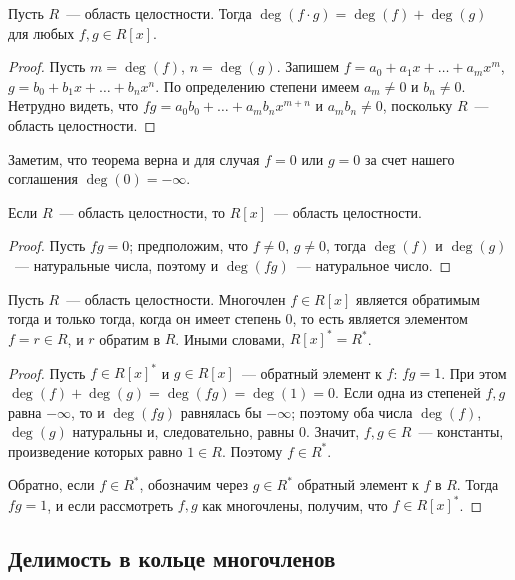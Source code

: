\begin{theorem}
Пусть $R$~--- область целостности. Тогда
$\deg(f\cdot g)=\deg(f)+\deg(g)$ для любых $f,g\in R[x]$.
\end{theorem}
\begin{proof}
Пусть $m=\deg(f)$, $n=\deg(g)$. Запишем $f=a_0+a_1x+\dots+a_mx^m$,
$g=b_0+b_1x+\dots+b_nx^n$. По определению степени имеем $a_m\neq 0$ и
$b_n\neq 0$. Нетрудно видеть, что $fg=a_0b_0+\dots+a_mb_nx^{m+n}$ и
$a_mb_n\neq 0$, поскольку $R$~--- область целостности.
\end{proof}

\begin{remark}
Заметим, что теорема верна и для случая $f=0$ или $g=0$ за счет нашего
соглашения $\deg(0)=-\infty$.
\end{remark}

\begin{corollary}\label{cor:r[x]_is_domain}
Если $R$~--- область целостности, то $R[x]$~--- область целостности.
\end{corollary}
\begin{proof}
Пусть $fg=0$; предположим, что $f\neq 0$, $g\neq 0$, тогда $\deg(f)$ и
$\deg(g)$~--- натуральные числа, поэтому и $\deg(fg)$~--- натуральное число.
\end{proof}

\begin{corollary}
Пусть $R$~--- область целостности.
Многочлен $f\in R[x]$ является обратимым тогда и только тогда, когда
он имеет степень $0$, то есть является элементом $f=r\in R$, и $r$
обратим в $R$. Иными словами, $R[x]^*=R^*$.
\end{corollary}
\begin{proof}
Пусть $f\in R[x]^*$ и $g\in R[x]$~--- обратный элемент к $f$:
$fg=1$. При этом $\deg(f)+\deg(g)=\deg(fg)=\deg(1)=0$. Если одна из
степеней $f,g$ равна $-\infty$, то и $\deg(fg)$ равнялась бы
$-\infty$; поэтому оба числа $\deg(f)$, $\deg(g)$ натуральны и,
следовательно, равны $0$. Значит, $f,g\in R$~--- константы,
произведение которых равно $1\in R$. Поэтому $f\in R^*$.

Обратно, если $f\in R^*$, обозначим через $g\in R^*$ обратный элемент
к $f$ в $R$. Тогда $fg=1$, и если рассмотреть $f,g$ как многочлены,
получим, что $f\in R[x]^*$.
\end{proof}


\subsection{Делимость в кольце многочленов}

